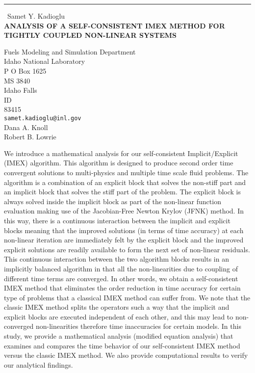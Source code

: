 \documentclass{report}
\begin{document}
\begin{center}
\rule{6in}{1pt} \
{\large Samet Y. Kadioglu \\
{\bf ANALYSIS OF A SELF-CONSISTENT IMEX METHOD FOR TIGHTLY COUPLED NON-LINEAR SYSTEMS}}

Fuels Modeling and Simulation Department \\ Idaho National Laboratory \\ P O Box 1625 \\ MS 3840 \\ Idaho Falls \\ ID \\ 83415
\\
{\tt samet.kadioglu@inl.gov}\\
Dana  A. Knoll\\
Robert  B.  Lowrie\end{center}

We introduce a mathematical analysis for our self-consistent
Implicit/Explicit (IMEX) algorithm. This algorithm is designed to produce
second order time convergent solutions to multi-physics
and multiple time scale fluid problems. The algorithm is a combination of
an explicit block that solves the non-stiff
part and an implicit block that solves the stiff part of the problem. The
explicit block is always solved inside the implicit block as part of the
non-linear function evaluation making use of the Jacobian-Free Newton
Krylov (JFNK) method. In this way, there is a continuous interaction
between the implicit and explicit blocks meaning that the improved
solutions (in terms of time accuracy) at each non-linear iteration are
immediately felt by the explicit block and the improved explicit
solutions are
readily available to form the next set of non-linear residuals. This
continuous interaction between the two algorithm blocks results in an
implicitly balanced algorithm in that all the non-linearities due to
coupling of different time terms are converged. In other words, we obtain
a self-consistent
IMEX method that eliminates the order reduction in time accuracy for
certain type of problems that a classical IMEX method can suffer from. We
note that the classic IMEX method splits the operators such a way that
the implicit and explicit blocks are executed independent of each other,
and this may lead to non-converged non-linearities therefore time
inaccuracies for certain models. In this study, we provide a mathematical
analysis (modified equation analysis) that examines and compares the time
behavior of our self-consistent IMEX method versus the classic IMEX
method. We also provide computational results to verify our analytical
findings.
\end{document}

